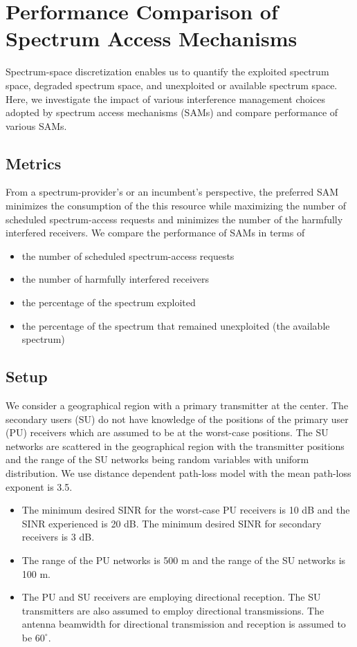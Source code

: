 \documentclass[journal,12pt,draftclsnofoot,onecolumn]{IEEEtran}
\begin{document}
\section{Performance Comparison of Spectrum Access Mechanisms}
Spectrum-space discretization enables us to quantify the exploited spectrum space, degraded spectrum space, and unexploited or available spectrum space. Here, we investigate the impact of various interference management choices adopted by spectrum access mechanisms (SAMs) and compare performance of various SAMs.

\subsection{Metrics}
From a spectrum-provider's or an incumbent's perspective, the preferred SAM minimizes the consumption of the this resource while maximizing the number of scheduled spectrum-access requests and minimizes the number of the harmfully interfered receivers. We compare the performance of SAMs in terms of
\begin{itemize}
	\item the number of scheduled spectrum-access requests
  \item the number of harmfully interfered receivers 
  \item the percentage of the spectrum exploited
	\item the percentage of the spectrum that remained unexploited (the available spectrum)  
\end{itemize}

\subsection{Setup}
We consider a geographical region with a primary transmitter at the center. The secondary users (SU) do not have knowledge of the positions of the primary user (PU) receivers which are assumed to be at the worst-case positions. The SU networks are scattered in the geographical region with the transmitter positions and the range of the SU networks being random variables with uniform distribution. We use distance dependent path-loss model with the mean path-loss exponent is 3.5. 
\begin{itemize}
	\item The minimum desired SINR for the worst-case PU receivers is 10 dB and the SINR experienced is 20 dB. The minimum desired SINR for secondary receivers is 3 dB.
	\item The range of the PU networks is 500 m and the range of the SU networks is 100 m. 
\item The PU and SU receivers are employing directional reception. The SU transmitters are also assumed to employ directional transmissions. The antenna beamwidth for directional transmission and reception is assumed to be $60^\circ$. 
\end{itemize}
\end{document}
